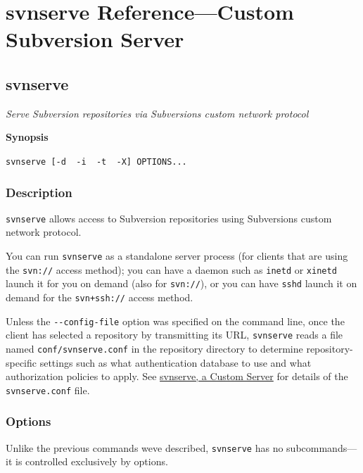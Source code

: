 \chapter{svnserve Reference---Custom Subversion
Server}\label{svn.ref.svnserve}

\section{svnserve}\label{svn.ref.svnserve.re}

\emph{Serve Subversion repositories via Subversion\textquotesingle s
custom network protocol}

\textbf{Synopsis}

\texttt{svnserve\ {[}-d\ \textbar{}\ -i\ \textbar{}\ -t\ \textbar{}\ -X{]}\ OPTIONS...}

\subsection{Description}\label{svn.ref.svnserve.re.desc}

\texttt{svnserve} allows access to Subversion repositories using
Subversion\textquotesingle s custom network protocol.

You can run \texttt{svnserve} as a standalone server process (for
clients that are using the \texttt{svn://} access method); you can have
a daemon such as \texttt{inetd} or \texttt{xinetd} launch it for you on
demand (also for \texttt{svn://}), or you can have \texttt{sshd} launch
it on demand for the \texttt{svn+ssh://} access method.

Unless the \texttt{-\/-config-file} option was specified on the command
line, once the client has selected a repository by transmitting its URL,
\texttt{svnserve} reads a file named \texttt{conf/svnserve.conf} in the
repository directory to determine repository-specific settings such as
what authentication database to use and what authorization policies to
apply. See \hyperref[svn.serverconfig.svnserve]{svnserve, a Custom
Server} for details of the \texttt{svnserve.conf} file.

\subsection{Options}\label{svn.ref.svnserve.re.options}

Unlike the previous commands we\textquotesingle ve described,
\texttt{svnserve} has no subcommands---it is controlled exclusively by
options.

